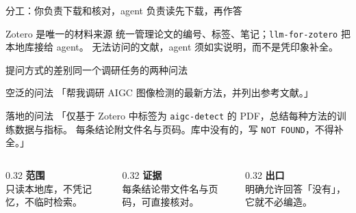 \documentclass[aspectratio=169]{beamer}
\begin{document}
\begin{frame}{分工：你负责下载和核对，agent 负责读}{先下载，再作答}
  \begin{center}
  \end{center}
  \begin{block}{Zotero 是唯一的材料来源}
    统一管理论文的编号、标签、笔记；\texttt{llm-for-zotero} 把本地库接给 agent。
    无法访问的文献，agent 须如实说明，而不是凭印象补全。
  \end{block}
\end{frame}

\begin{frame}{提问方式的差别}{同一个调研任务的两种问法}
  \begin{alertblock}{空泛的问法}
    「帮我调研 AIGC 图像检测的最新方法，并列出参考文献。」
  \end{alertblock}
  \begin{exampleblock}{落地的问法}
    「仅基于 Zotero 中标签为 \texttt{aigc-detect} 的 PDF，总结每种方法的训练数据与指标。
    每条结论附文件名与页码。库中没有的，写 \texttt{NOT FOUND}，不得补全。」
  \end{exampleblock}
  \begin{columns}[T]
    \begin{column}{0.32\textwidth}
      \textcolor{sig}{\textbf{范围}}\\[2pt]
      \small 只读本地库，不凭记忆，不临时检索。
    \end{column}
    \begin{column}{0.32\textwidth}
      \textcolor{accent}{\textbf{证据}}\\[2pt]
      \small 每条结论带文件名与页码，可直接核对。
    \end{column}
    \begin{column}{0.32\textwidth}
      \textcolor{video}{\textbf{出口}}\\[2pt]
      \small 明确允许回答「没有」，它就不必编造。
    \end{column}
  \end{columns}
\end{frame}
\end{document}
